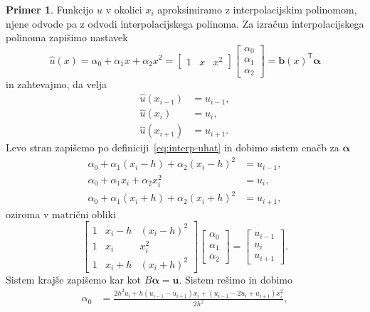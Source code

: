 \documentclass[12pt,a4paper,twoside]{article}
\theoremstyle{definition} %
\newtheorem{primer}[definicija]{Primer}
\theoremstyle{plain} %
\numberwithin{equation}{section}
\newcommand{\T}{\mathsf{T}}
\renewcommand{\b}{\boldsymbol}
\begin{document}
\begin{primer}
Funkcijo $u$ v okolici $x_i$ aproksimiramo z interpolacijskim polinomom, njene odvode pa z odvodi
interpolacijskega polinoma. Za izračun interpolacijskega polinoma zapišimo nastavek
\begin{equation}
  \label{eq:interp-uhat}
  \hat{u}(x) = \alpha_0 + \alpha_1x + \alpha_2x^2 =
  \begin{bmatrix}
    1 & x & x^2
  \end{bmatrix}
  \begin{bmatrix}
    \alpha_0 \\ \alpha_1 \\ \alpha_2
  \end{bmatrix} = \b{b}(x)^\T\b{\alpha}
\end{equation}
in zahtevajmo, da velja
\begin{align}
  \hat{u}(x_{i-1}) &= u_{i-1}, \\
  \hat{u}(x_{i}) &= u_{i}, \\
  \hat{u}(x_{i+1}) &= u_{i+1}.
\end{align}
Levo stran zapišemo po definiciji~\eqref{eq:interp-uhat} in dobimo
sistem enačb za $\b\alpha$
\begin{align}
  \alpha_0 + \alpha_1 (x_i -h) + \alpha_2 (x_i-h)^2 &= u_{i-1}, \\
  \alpha_0 + \alpha_1 x_{i} + \alpha_2 x_{i}^2 &= u_{i}, \\
  \alpha_0 + \alpha_1 (x_i +h) + \alpha_2 (x_i+h)^2 &= u_{i+1},
\end{align}
oziroma v matrični obliki
\begin{equation}
  \begin{bmatrix}
    1 & x_i - h & (x_i-h)^2 \\
    1 & x_i & x_i^2 \\
    1 & x_i + h & (x_i+h)^2
  \end{bmatrix}
  \begin{bmatrix}
    \alpha_0 \\ \alpha_1 \\ \alpha_2
  \end{bmatrix}
  =
  \begin{bmatrix}
    u_{i-1} \\ u_i  \\ u_{i+1}
  \end{bmatrix}.
\end{equation}
Sistem krajše zapišemo kar kot $B\b\alpha = \b{u}$. Sistem rešimo in dobimo
\begin{align}
  \alpha_0 &= \frac{2 h^2 u_{i}+h (u_{i-1}-u_{i+1}) x_i+(u_{i-1}-2 u_{i}+u_{i+1}) x_i^2}{2 h^2}, \\

\end{align}
\end{primer}
\end{document}
